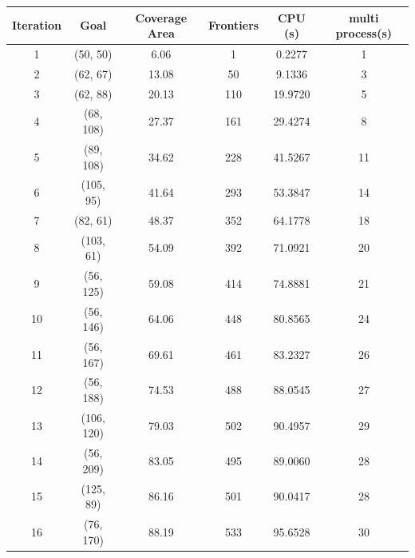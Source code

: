 \begin{table}[ht]
\centering
\begin{tabular}{|c|c|c|c|c|c|}
\hline
Iteration & Goal      & Coverage Area   & Frontiers & CPU (s)  & multi process(s) \\ \hline
1         & (50, 50)  & 6.06            & 1         & 0.2277       
& 1                      \\ \hline
2         & (62, 67)  & 13.08           & 50        & 9.1336                 & 3                      \\ \hline
3         & (62, 88)  & 20.13           & 110       & 19.9720                & 5                      \\ \hline
4         & (68, 108) & 27.37           & 161       & 29.4274                & 8                      \\ \hline
5         & (89, 108) & 34.62           & 228       & 41.5267                & 11                     \\ \hline
6         & (105, 95) & 41.64           & 293       & 53.3847                & 14                     \\ \hline
7         & (82, 61)  & 48.37           & 352       & 64.1778                & 18                     \\ \hline
8         & (103, 61) & 54.09           & 392       & 71.0921                & 20                     \\ \hline
9         & (56, 125) & 59.08           & 414       & 74.8881                & 21                     \\ \hline
10        & (56, 146) & 64.06           & 448       & 80.8565                & 24                     \\ \hline
11        & (56, 167) & 69.61           & 461       & 83.2327                & 26                     \\ \hline
12        & (56, 188) & 74.53           & 488       & 88.0545                & 27                     \\ \hline
13        & (106, 120)& 79.03           & 502       & 90.4957                & 29                     \\ \hline
14        & (56, 209) & 83.05           & 495       & 89.0060                & 28                     \\ \hline
15        & (125, 89) & 86.16           & 501       & 90.0417                & 28                     \\ \hline
16        & (76, 170) & 88.19           & 533       & 95.6528                & 30                     \\ \hline

\end{tabular}
\end{table}
